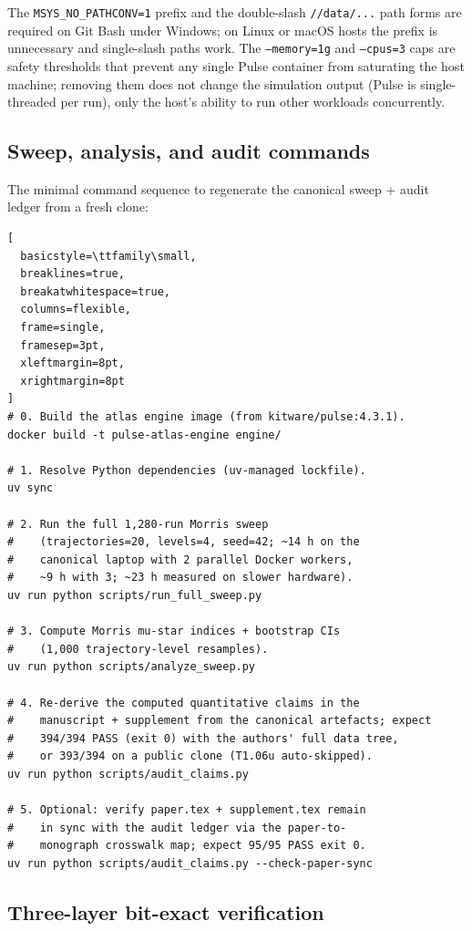 \documentclass[pdflatex,sn-nature]{sn-jnl}%
\begin{document}
The \texttt{MSYS\_NO\_PATHCONV=1} prefix and the double-slash \texttt{//data/...} path forms are required on Git Bash under Windows; on Linux or macOS hosts the prefix is unnecessary and single-slash paths work. The \texttt{--memory=1g} and \texttt{--cpus=3} caps are safety thresholds that prevent any single Pulse container from saturating the host machine; removing them does not change the simulation output (Pulse is single-threaded per run), only the host's ability to run other workloads concurrently.

\subsection{Sweep, analysis, and audit commands}\label{sec:s12-cmds}

The minimal command sequence to regenerate the canonical sweep + audit ledger from a fresh clone:

\begin{lstlisting}[
  basicstyle=\ttfamily\small,
  breaklines=true,
  breakatwhitespace=true,
  columns=flexible,
  frame=single,
  framesep=3pt,
  xleftmargin=8pt,
  xrightmargin=8pt
]
# 0. Build the atlas engine image (from kitware/pulse:4.3.1).
docker build -t pulse-atlas-engine engine/

# 1. Resolve Python dependencies (uv-managed lockfile).
uv sync

# 2. Run the full 1,280-run Morris sweep
#    (trajectories=20, levels=4, seed=42; ~14 h on the
#    canonical laptop with 2 parallel Docker workers,
#    ~9 h with 3; ~23 h measured on slower hardware).
uv run python scripts/run_full_sweep.py

# 3. Compute Morris mu-star indices + bootstrap CIs
#    (1,000 trajectory-level resamples).
uv run python scripts/analyze_sweep.py

# 4. Re-derive the computed quantitative claims in the
#    manuscript + supplement from the canonical artefacts; expect
#    394/394 PASS (exit 0) with the authors' full data tree,
#    or 393/394 on a public clone (T1.06u auto-skipped).
uv run python scripts/audit_claims.py

# 5. Optional: verify paper.tex + supplement.tex remain
#    in sync with the audit ledger via the paper-to-
#    monograph crosswalk map; expect 95/95 PASS exit 0.
uv run python scripts/audit_claims.py --check-paper-sync
\end{lstlisting}

\subsection{Three-layer bit-exact verification}\label{sec:s12-verify}
\end{document}
